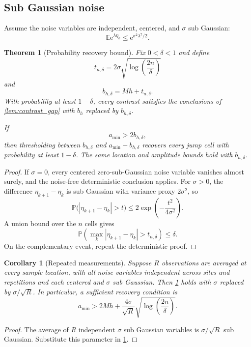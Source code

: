 \documentclass[11pt,letterpaper]{article}
\newtheorem{theorem}{Theorem}[section]
\theoremstyle{plain}
\theoremstyle{plain}
\theoremstyle{plain}
\newtheorem{corollary}[corollary]{Corollary}
\theoremstyle{definition}
\theoremstyle{definition}
\theoremstyle{definition}
\theoremstyle{definition}
\theoremstyle{remark}
\theoremstyle{remark}
\theoremstyle{remark}
\theoremstyle{remark}
\newcommand{\e}{\mathrm e}
\begin{document}
\subsection{Sub Gaussian noise}

Assume the noise variables are independent, centered, and \(\sigma\) sub Gaussian:
\[
\mathbb E\e^{\lambda\eta_k}
\leq
\e^{\sigma^2\lambda^2/2}.
\]

\begin{theorem}[Probability recovery bound]\label{thm:probability_recovery}
Fix \(0<\delta<1\) and define
\[
t_{n,\delta}
=
2\sigma
\sqrt{\log\left(\frac{2n}{\delta}\right)}
\]
and
\[
b_{h,\delta}=Mh+t_{n,\delta}.
\]
With probability at least \(1-\delta\), every contrast satisfies the conclusions of \cref{lem:contrast_gap} with \(b_h\) replaced by \(b_{h,\delta}\).

If
\[
a_{\min}>2b_{h,\delta},
\]
then thresholding between \(b_{h,\delta}\) and \(a_{\min}-b_{h,\delta}\) recovers every jump cell with probability at least \(1-\delta\). The same location and amplitude bounds hold with \(b_{h,\delta}\).
\end{theorem}

\begin{proof}
If \(\sigma=0\), every centered zero-sub-Gaussian noise variable vanishes almost surely, and the noise-free deterministic conclusion applies. For \(\sigma>0\), the difference \(\eta_{k+1}-\eta_k\) is sub Gaussian with variance proxy \(2\sigma^2\), so
\[
\mathbb P\bigl(|\eta_{k+1}-\eta_k|>t\bigr)
\leq
2\exp\left(-\frac{t^2}{4\sigma^2}\right).
\]
A union bound over the \(n\) cells gives
\[
\mathbb P\left(
\max_k|\eta_{k+1}-\eta_k|>t_{n,\delta}
\right)
\leq
\delta.
\]
On the complementary event, repeat the deterministic proof.
\end{proof}

\begin{corollary}[Repeated measurements]\label{cor:repeated_measurements}
Suppose \(R\) observations are averaged at every sample location, with all noise variables independent across sites and repetitions and each centered and \(\sigma\) sub Gaussian. Then \cref{thm:probability_recovery} holds with \(\sigma\) replaced by \(\sigma/\sqrt R\). In particular, a sufficient recovery condition is
\[
a_{\min}
>
2Mh+
\frac{4\sigma}{\sqrt R}
\sqrt{\log\left(\frac{2n}{\delta}\right)}.
\]
\end{corollary}

\begin{proof}
The average of \(R\) independent \(\sigma\) sub Gaussian variables is \(\sigma/\sqrt R\) sub Gaussian. Substitute this parameter in \cref{thm:probability_recovery}.
\end{proof}
\end{document}
